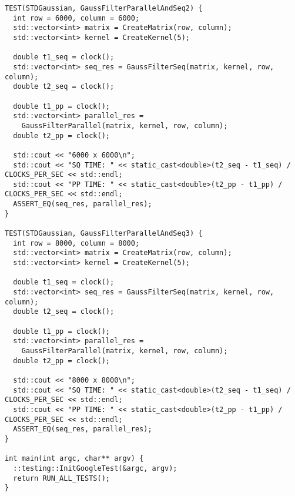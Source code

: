 \documentclass{report}
\begin{document}
\begin{lstlisting}
TEST(STDGaussian, GaussFilterParallelAndSeq2) {
  int row = 6000, column = 6000;
  std::vector<int> matrix = CreateMatrix(row, column);
  std::vector<int> kernel = CreateKernel(5);

  double t1_seq = clock();
  std::vector<int> seq_res = GaussFilterSeq(matrix, kernel, row, column);
  double t2_seq = clock();

  double t1_pp = clock();
  std::vector<int> parallel_res =
    GaussFilterParallel(matrix, kernel, row, column);
  double t2_pp = clock();

  std::cout << "6000 x 6000\n";
  std::cout << "SQ TIME: " << static_cast<double>(t2_seq - t1_seq) / CLOCKS_PER_SEC << std::endl;
  std::cout << "PP TIME: " << static_cast<double>(t2_pp - t1_pp) / CLOCKS_PER_SEC << std::endl;
  ASSERT_EQ(seq_res, parallel_res);
}

TEST(STDGaussian, GaussFilterParallelAndSeq3) {
  int row = 8000, column = 8000;
  std::vector<int> matrix = CreateMatrix(row, column);
  std::vector<int> kernel = CreateKernel(5);

  double t1_seq = clock();
  std::vector<int> seq_res = GaussFilterSeq(matrix, kernel, row, column);
  double t2_seq = clock();

  double t1_pp = clock();
  std::vector<int> parallel_res =
    GaussFilterParallel(matrix, kernel, row, column);
  double t2_pp = clock();

  std::cout << "8000 x 8000\n";
  std::cout << "SQ TIME: " << static_cast<double>(t2_seq - t1_seq) / CLOCKS_PER_SEC << std::endl;
  std::cout << "PP TIME: " << static_cast<double>(t2_pp - t1_pp) / CLOCKS_PER_SEC << std::endl;
  ASSERT_EQ(seq_res, parallel_res);
}

int main(int argc, char** argv) {
  ::testing::InitGoogleTest(&argc, argv);
  return RUN_ALL_TESTS();
}

\end{lstlisting}
\end{document}
